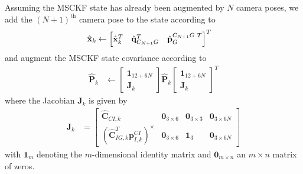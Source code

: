 \documentclass[letterpaper, 10 pt, conference]{ieeeconf}  %
\def\Vec#1{\mathbf{#1}}
\newcommand{\bbm}{\begin{bmatrix}}
\newcommand{\ebm}{\end{bmatrix}}
\begin{document}
Assuming the MSCKF state has already been augmented by $N$ camera poses, we add the $\left(N+1\right)^\text{th}$ camera pose to the state according to
\begin{align}
    \hat{\Vec{x}}_k &\leftarrow \bbm \hat{\Vec{x}}_k^T & \hat{\Vec{q}}_{C_{N+1} G}^T & \hat{\Vec{p}}_G^{C_{N+1} G \hspace{0.3em} T} \ebm^T 
\end{align}
and augment the MSCKF state covariance according to
\begin{align}
    \hat{\Vec{P}}_k &\leftarrow \bbm \Vec{1}_{12+6N} \\ \Vec{J}_k \ebm \hat{\Vec{P}}_k \bbm \Vec{1}_{12+6N} \\ \Vec{J}_k \ebm^T
\end{align}
where the Jacobian $\Vec{J}_k$ is given by
\begin{align}
\Vec{J}_k &= \bbm \hat{\Vec{C}}_{C I, k} & \Vec{0}_{3\times6} & \Vec{0}_{3\times3} & \Vec{0}_{3\times6N} \\
                            \left(\hat{\Vec{C}}_{I G, k}^T \Vec{p}_{I,k}^{CI}\right)^\times & \Vec{0}_{3\times6} & \Vec{1}_3 & \Vec{0}_{3\times6N}
                \ebm
\end{align}
with $\Vec 1_m$ denoting the $m$-dimensional identity matrix and $\Vec 0_{m\times n}$ an $m\times n$ matrix of zeros.
\end{document}
